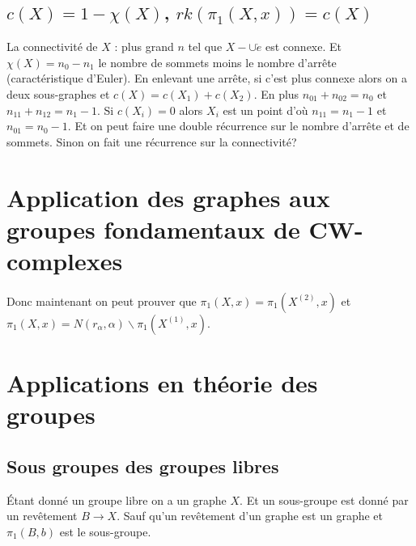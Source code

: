 \documentclass[a4paper,12pt]{book}
\theoremstyle{plain}
\theoremstyle{definition}
\theoremstyle{remark}
\begin{document}
\subsection{$c(X)=1-\chi(X)$, $rk(\pi_1(X,x))=c(X)$}
La connectivité de $X$ : plus grand $n$ tel que 
$X-\cup \mathring e$ est connexe. Et $\chi(X)=n_0-n_1$ le
nombre de sommets moins le nombre d'arrête (caractéristique
d'Euler). En enlevant une arrête, si c'est plus connexe alors
on a deux sous-graphes et $c(X)=c(X_1)+c(X_2)$. En plus 
$n_{01}+n_{02}=n_0$ et $n_{11}+n_{12}=n_1-1$. Si $c(X_i)=0$ alors
$X_i$ est un point d'où $n_{11}=n_1-1$ et $n_{01}=n_0-1$. Et on
peut faire une double récurrence sur le nombre d'arrête et de
sommets. Sinon on fait une récurrence sur la connectivité?


\section{Application des graphes aux groupes fondamentaux de
CW-complexes}
Donc maintenant on peut prouver que $\pi_1(X,x)=\pi_1(X^{(2)},x)$
et $\pi_1(X,x)=N(r_\alpha,\alpha)\backslash\pi_1(X^{(1)},x)$.

\section{Applications en théorie des groupes}
\subsection{Sous groupes des groupes libres}
Étant donné un groupe libre on a un graphe $X$. Et un sous-groupe
est donné par un revêtement $B\to X$. Sauf qu'un revêtement d'un
graphe est un graphe et $\pi_1(B,b)$ est le sous-groupe.










\end{document}
